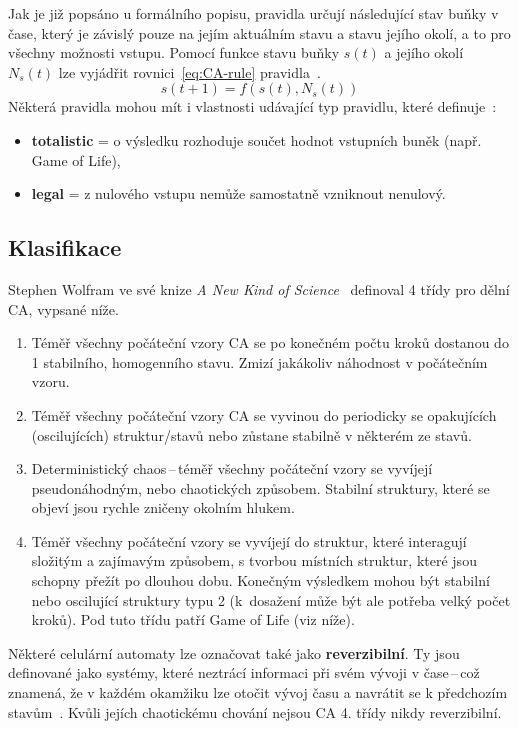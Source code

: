 Jak je již popsáno u formálního popisu, pravidla určují následující stav buňky v čase, který je závislý pouze na jejím aktuálním stavu a stavu jejího okolí, a to pro všechny možnosti vstupu. Pomocí funkce stavu buňky ${s(t)}$ a jejího okolí ${N_s(t)}$ lze vyjádřit rovnici~\ref{eq:CA-rule} pravidla~\cite{ims}.
\begin{equation}
s(t + 1) = f(s(t), N_s(t))
\label{eq:CA-rule}
\end{equation}
Některá pravidla mohou mít i vlastnosti udávající typ pravidlu, které definuje~\cite{mechanics-CA}:
\begin{itemize}
    \item \textbf{totalistic} = o výsledku rozhoduje součet hodnot vstupních buněk (např. Game of Life),
    \item \textbf{legal} = z nulového vstupu nemůže samostatně vzniknout nenulový.
\end{itemize}

\subsection*{Klasifikace}
Stephen Wolfram ve své knize \textit{A New Kind of Science}~\cite{wolfram-NewKindOfScience} definoval 4 třídy pro dělní CA, vypsané níže.
\begin{enumerate}
    \item Téměř všechny počáteční vzory CA se po konečném počtu kroků dostanou do 1 stabilního, homogenního stavu. Zmizí jakákoliv náhodnost v počátečním vzoru.
    \item Téměř všechny počáteční vzory CA se vyvinou do periodicky se opakujících (oscilujících) struktur/stavů nebo zůstane stabilně v některém ze stavů.
    \item Deterministický chaos\,--\,téměř všechny počáteční vzory se vyvíjejí pseudonáhodným, nebo chaotických způsobem. Stabilní struktury, které se objeví jsou rychle zničeny okolním hlukem.
    \item Téměř všechny počáteční vzory se vyvíjejí do struktur, které interagují složitým a zajímavým způsobem, s tvorbou místních struktur, které jsou schopny přežít po dlouhou dobu. Konečným výsledkem mohou být stabilní nebo oscilující struktury typu 2 (k~dosažení může být ale potřeba velký počet kroků). Pod tuto třídu patří Game of Life (viz níže).
\end{enumerate}

Některé celulární automaty lze označovat také jako \textbf{reverzibilní}. Ty jsou definované jako systémy, které neztrácí informaci při svém vývoji v čase\,--\,což znamená, že v každém okamžiku lze otočit vývoj času a navrátit se k předchozím stavům~\cite{ims}. Kvůli jejích chaotickému chování nejsou CA 4. třídy nikdy reverzibilní.


